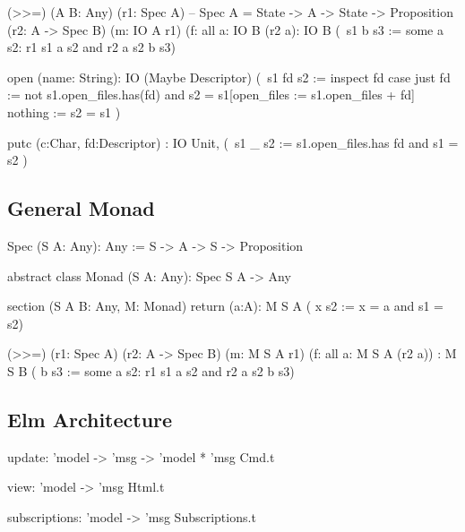 %
\begin{alba}
    (>>=)
        (A B: Any)
        (r1: Spec A)            -- Spec A = State -> A -> State -> Proposition
        (r2: A -> Spec B)
        (m: IO A r1)
        (f: all a: IO B (r2 a):
        IO  B
            (\ s1 b s3 :=
                some a s2: r1 s1 a s2 and r2 a s2 b s3)
\end{alba}
%


\begin{alba}
  open (name: String):
       IO (Maybe  Descriptor)
          (\ s1  fd  s2 :=
               inspect fd case
                  just fd :=
                     not s1.open_files.has(fd)
                     and
                     s2 = s1[open_files := s1.open_files + fd]
                  nothing :=
                     s2 = s1 )

  putc (c:Char, fd:Descriptor)
       : IO  Unit,
             (\ s1 _ s2 :=
                  s1.open_files.has fd  and
                  s1 = s2 )
\end{alba}



\subsection{General Monad}

\begin{alba}
  Spec (S A: Any): Any
    := S -> A -> S -> Proposition


  abstract class
    Monad (S A: Any): Spec S A -> Any

  section (S A B: Any, M: Monad)
    return (a:A): M S A
                    ( x s2 :=  x = a  and  s1 = s2)

    (>>=) (r1: Spec A)
          (r2: A -> Spec B)
          (m: M S A r1)
          (f: all a: M S A (r2 a))
          : M S B
              ( b s3 :=
                  some a s2:
                    r1 s1 a s2
                    and
                    r2 a s2 b s3)
\end{alba}











\subsection{Elm Architecture}


\begin{ocaml}
  update: 'model -> 'msg -> 'model * 'msg Cmd.t

  view: 'model -> 'msg Html.t

  subscriptions: 'model -> 'msg Subscriptions.t
\end{ocaml}






